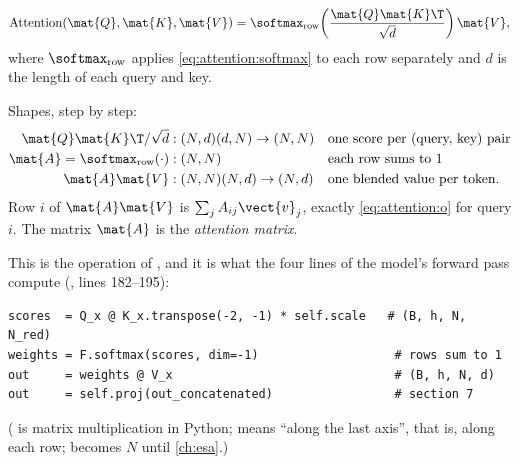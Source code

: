 \begin{definition}
\begin{equation}\label{eq:attention:sdpa}
  \operatorname{Attention}(\mat{Q}, \mat{K}, \mat{V}) = \softmax_{\text{row}}\!\left(\frac{\mat{Q}\mat{K}\T}{\sqrt{d}}\right)\mat{V},
\end{equation}
where $\softmax_{\text{row}}$ applies \cref{eq:attention:softmax} to each row separately and $d$
is the length of each query and key.
\end{definition}
Shapes, step by step:
\begin{align*}
  \mat{Q}\mat{K}\T/\sqrt{d} &: (N, d)(d, N)\to(N, N) && \text{one score per (query, key) pair}\\
  \mat{A} = \softmax_{\text{row}}(\cdot) &: (N, N) && \text{each row sums to 1}\\
  \mat{A}\mat{V} &: (N, N)(N, d)\to(N, d) && \text{one blended value per token.}
\end{align*}
Row $i$ of $\mat{A}\mat{V}$ is $\sum_j A_{ij}\vect{v}_j$, exactly \cref{eq:attention:o} for query
$i$. The matrix $\mat{A}$ is the \emph{attention matrix}.

This is the operation of \citet{vaswani2017attention}, and it is what the four lines of the
model's forward pass compute (, lines 182--195):
\begin{lstlisting}
scores  = Q_x @ K_x.transpose(-2, -1) * self.scale   # (B, h, N, N_red)
weights = F.softmax(scores, dim=-1)                   # rows sum to 1
out     = weights @ V_x                               # (B, h, N, d)
out     = self.proj(out_concatenated)                 # section 7
\end{lstlisting}
( is matrix multiplication in Python;  means ``along the last axis'', that is,
along each row;  becomes $N$ until \cref{ch:esa}.)


